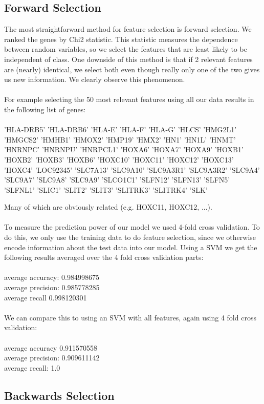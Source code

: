 \documentclass[11pt]{article}
\begin{document}
\subsection{Forward Selection}
The most straightforward method for feature selection is forward selection. We ranked the genes by Chi2 statistic. This statistic measures the dependence between random variables, so we select the features that are least likely to be independent of class. One downside of this method is that if 2 relevant features are (nearly) identical, we select both even though really only one of the two gives us new information. We clearly observe this phenomenon. \\\\
For example selecting the 50 most relevant features using all our data results in the following list of genes:\\\\
'HLA-DRB5' 'HLA-DRB6' 'HLA-E' 'HLA-F' 'HLA-G' 'HLCS' 'HMG2L1' 'HMGCS2'
 'HMHB1' 'HMOX2' 'HMP19' 'HMX2' 'HN1' 'HN1L' 'HNMT' 'HNRNPC' 'HNRNPU'
 'HNRPCL1' 'HOXA6' 'HOXA7' 'HOXA9' 'HOXB1' 'HOXB2' 'HOXB3' 'HOXB6' 'HOXC10'
 'HOXC11' 'HOXC12' 'HOXC13' 'HOXC4' 'LOC92345' 'SLC7A13' 'SLC9A10'
 'SLC9A3R1' 'SLC9A3R2' 'SLC9A4' 'SLC9A7' 'SLC9A8' 'SLC9A9' 'SLCO1C1'
 'SLFN12' 'SLFN13' 'SLFN5' 'SLFNL1' 'SLIC1' 'SLIT2' 'SLIT3' 'SLITRK3'
 'SLITRK4' 'SLK'
 
Many of which are obviously related (e.g. HOXC11, HOXC12, ...).\\\\
To measure the prediction power of our model we used 4-fold cross validation. To do this, we only use the training data to do feature selection, since we otherwise encode information about the test data into our model. Using a SVM we get the following results averaged over the 4 fold cross validation parts:\\\\
average accuracy: 0.984998675\\
average precision: 0.985778285\\
average recall 0.998120301\\\\
We can compare this to using an SVM with all features, again using 4 fold cross validation:\\\\
average accuracy 0.911570558\\
average precision: 0.909611142\\
average recall: 1.0\\
\subsection{Backwards Selection}
\end{document}
